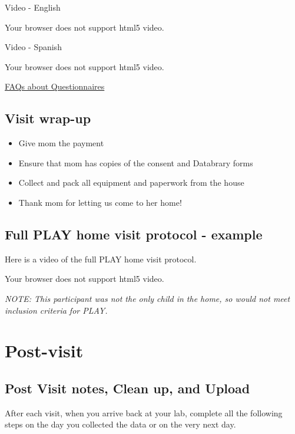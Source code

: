 \documentclass[
  12pt,
]{book}
\providecommand{\tightlist}{%
  \setlength{\itemsep}{0pt}\setlength{\parskip}{0pt}}
\begin{document}
Video - English

Your browser does not support html5 video.

Video - Spanish

Your browser does not support html5 video.

\protect\hyperlink{faqs_questionnaires}{FAQs about Questionnaires}

\hypertarget{visit-wrap-up}{%
\section{Visit wrap-up}\label{visit-wrap-up}}

\begin{itemize}
\tightlist
\item
  Give mom the payment
\item
  Ensure that mom has copies of the consent and Databrary forms
\item
  Collect and pack all equipment and paperwork from the house
\item
  Thank mom for letting us come to her home!
\end{itemize}

\hypertarget{full-play-home-visit-protocol---example-1}{%
\section{Full PLAY home visit protocol - example}\label{full-play-home-visit-protocol---example-1}}

Here is a video of the full PLAY home visit protocol.

Your browser does not support html5 video.

\emph{NOTE: This participant was not the only child in the home, so would not meet inclusion criteria for PLAY.}

\hypertarget{post-visit}{%
\chapter{Post-visit}\label{post-visit}}

\hypertarget{post-visit-notes-clean-up-and-upload}{%
\section{Post Visit notes, Clean up, and Upload}\label{post-visit-notes-clean-up-and-upload}}

After each visit, when you arrive back at your lab, complete all the following steps on the day you collected the data or on the very next day.
\end{document}
